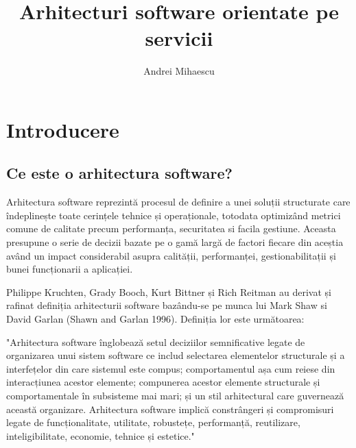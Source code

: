 \documentclass[12pt, a4paper, oneside, romanian]{teza-upb}
\begin{document}
\author{Andrei Mihaescu}

\title{Arhitecturi software orientate pe servicii}




\beforepreface
\listoffigures
\listoftables
{}

\afterpreface 

\chapter{Introducere}
\section{Ce este o arhitectura software?}
Arhitectura software reprezintă procesul de definire a unei soluții structurate care îndeplinește toate cerințele tehnice și operaționale, totodata optimizând metrici comune de calitate precum performanța, securitatea si facila gestiune. Aceasta presupune o serie de decizii bazate pe o gamă largă de factori fiecare din aceștia având un impact considerabil asupra calității, performanței, gestionabilitații și bunei funcționarii a aplicației.

Philippe Kruchten, Grady Booch, Kurt Bittner și Rich Reitman au derivat și rafinat definiția arhitecturii software bazându-se pe munca lui Mark Shaw si David Garlan (Shawn and Garlan 1996). Definiția lor este următoarea:

"Arhitectura software înglobează setul deciziilor semnificative legate de organizarea unui sistem software ce includ selectarea elementelor structurale și a interfețelor din care sistemul este compus; comportamentul așa cum reiese din interacțiunea acestor elemente; compunerea acestor elemente structurale și comportamentale în subsisteme mai mari; și un stil arhitectural care guvernează această organizare. Arhitectura software implică constrângeri și compromisuri legate de funcționalitate, utilitate, robustețe, performanță, reutilizare, inteligibilitate, economie, tehnice și estetice."
\end{document}
